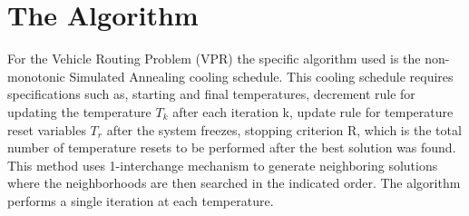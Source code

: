 \documentclass[11pt]{article}
\newcommand{\<}{\langle}
\renewcommand{\>}{\rangle}
\theoremstyle{definition}
\begin{document}
    \section{The Algorithm}
    For the Vehicle Routing Problem (VPR) the specific algorithm used is the non-monotonic Simulated Annealing cooling schedule. This cooling schedule requires specifications such as, starting and final temperatures, decrement rule for updating the temperature $T_k$ after each iteration k, update rule for temperature reset variables $T_{r}$ after the system freezes, stopping criterion R, which is the total number of temperature resets to be performed after the best solution was found. This method uses 1-interchange mechanism to generate neighboring solutions where the neighborhoods are then searched in the indicated order. The algorithm performs a single iteration at each temperature. \\ 
    
\end{document}
